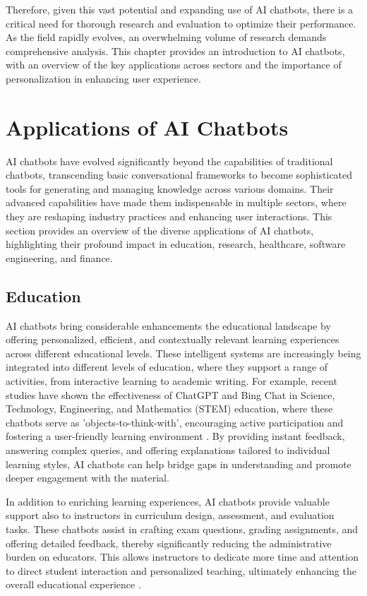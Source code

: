 Therefore, given this vast potential and expanding use of AI chatbots, there is a critical need for thorough research and evaluation to optimize their performance. As the field rapidly evolves, an overwhelming volume of research demands comprehensive analysis. This chapter provides an introduction to AI chatbots, with an overview of the key applications across sectors and the importance of personalization in enhancing user experience.

\section{Applications of AI Chatbots}

AI chatbots have evolved significantly beyond the capabilities of traditional chatbots, transcending basic conversational frameworks to become sophisticated tools for generating and managing knowledge across various domains. Their advanced capabilities have made them indispensable in multiple sectors, where they are reshaping industry practices and enhancing user interactions. This section provides an overview of the diverse applications of AI chatbots, highlighting their profound impact in education, research, healthcare, software engineering, and finance.

\subsection{Education}

AI chatbots bring considerable enhancements the educational landscape by offering personalized, efficient, and contextually relevant learning experiences across different educational levels. These intelligent systems are increasingly being integrated into different levels of education, where they support a range of activities, from interactive learning to academic writing. For example, recent studies have shown the effectiveness of ChatGPT and Bing Chat in Science, Technology, Engineering, and Mathematics (STEM) education, where these chatbots serve as 'objects-to-think-with', encouraging active participation and fostering a user-friendly learning environment \cite{vasconcelos2023enhancing}. By providing instant feedback, answering complex queries, and offering explanations tailored to individual learning styles, AI chatbots can help bridge gaps in understanding and promote deeper engagement with the material.

In addition to enriching learning experiences, AI chatbots provide valuable support also to instructors in curriculum design, assessment, and evaluation tasks. These chatbots assist in crafting exam questions, grading assignments, and offering detailed feedback, thereby significantly reducing the administrative burden on educators. This allows instructors to dedicate more time and attention to direct student interaction and personalized teaching, ultimately enhancing the overall educational experience \cite{dam2024complete}.

